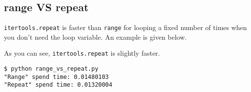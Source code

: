 \subsection{range VS repeat}

\lstinline{itertools.repeat} is faster than \lstinline{range} for looping a fixed number of times when you don't need the loop variable.
An example is given below.



As you can see, \lstinline{itertools.repeat} is slightly faster.

\begin{lstlisting}[caption=Output of range\_vs\_repeat.py]
$ python range_vs_repeat.py
"Range" spend time: 0.01480103
"Repeat" spend time: 0.01320004
\end{lstlisting}
